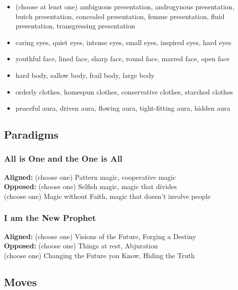 \documentclass[
]{memoir}
\begin{document}
\begin{itemize}
\tightlist
\item
  (choose at least one) ambiguous presentation, androgynous
  presentation, butch presentation, concealed presentation, femme
  presentation, fluid presentation, transgressing presentation
\item
  caring eyes, quiet eyes, intense eyes, small eyes, inspired eyes, hard
  eyes
\item
  youthful face, lined face, sharp face, round face, marred face, open
  face
\item
  hard body, sallow body, frail body, large body
\item
  orderly clothes, homespun clothes, conservative clothes, starched
  clothes
\item
  peaceful aura, driven aura, flowing aura, tight-fitting aura, hidden
  aura
\end{itemize}

\hypertarget{paradigms-4}{%
\subsection{Paradigms}\label{paradigms-4}}

\hypertarget{all-is-one-and-the-one-is-all}{%
\subsubsection{All is One and the One is
All}\label{all-is-one-and-the-one-is-all}}

\textbf{Aligned:} (choose one) Pattern magic, cooperative magic\\
\textbf{Opposed:} (choose one) Selfish magic, magic that divides\\
(choose one) Magic without Faith, magic that doesn't involve people

\hypertarget{i-am-the-new-prophet}{%
\subsubsection{I am the New Prophet}\label{i-am-the-new-prophet}}

\textbf{Aligned:} (choose one) Visions of the Future, Forging a
Destiny\\
\textbf{Opposed:} (choose one) Things at rest, Abjuration\\
(choose one) Changing the Future you Know, Hiding the Truth

\hypertarget{moves-4}{%
\subsection{Moves}\label{moves-4}}
\end{document}
